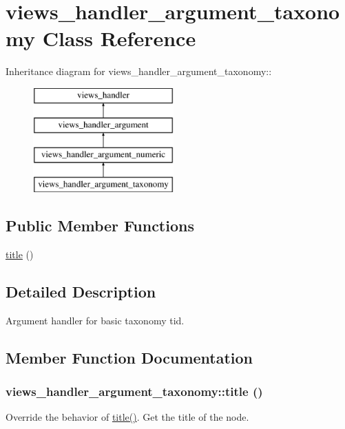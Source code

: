 \hypertarget{classviews__handler__argument__taxonomy}{
\section{views\_\-handler\_\-argument\_\-taxonomy Class Reference}
\label{classviews__handler__argument__taxonomy}
}
Inheritance diagram for views\_\-handler\_\-argument\_\-taxonomy::\begin{figure}[H]
\begin{center}
\leavevmode
\includegraphics[height=4cm]{classviews__handler__argument__taxonomy}
\end{center}
\end{figure}
\subsection*{Public Member Functions}
\begin{DoxyCompactItemize}
\item 
\hyperlink{classviews__handler__argument__taxonomy_a330517e71ccc84fe85e871e05640c36d}{title} ()
\end{DoxyCompactItemize}


\subsection{Detailed Description}
Argument handler for basic taxonomy tid. 

\subsection{Member Function Documentation}
\hypertarget{classviews__handler__argument__taxonomy_a330517e71ccc84fe85e871e05640c36d}{
\subsubsection[{title}]{\setlength{\rightskip}{0pt plus 5cm}views\_\-handler\_\-argument\_\-taxonomy::title ()}}
\label{classviews__handler__argument__taxonomy_a330517e71ccc84fe85e871e05640c36d}
Override the behavior of \hyperlink{classviews__handler__argument__taxonomy_a330517e71ccc84fe85e871e05640c36d}{title()}. Get the title of the node. 

